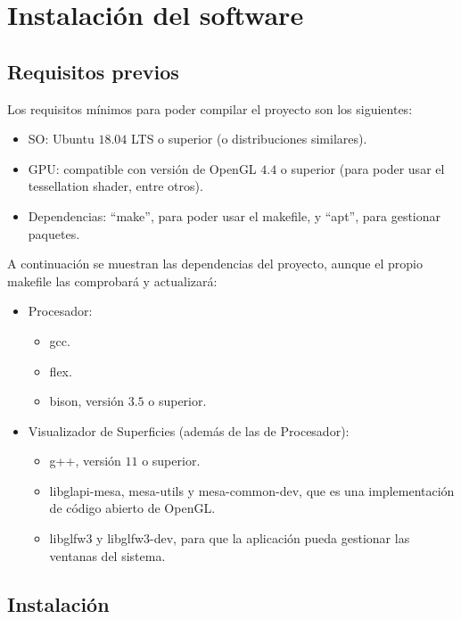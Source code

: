 
\chapter{Instalación del software}\label{ap:apendice1}

\section{Requisitos previos}

Los requisitos mínimos para poder compilar el proyecto son los siguientes:
\begin{itemize}
	\item SO: Ubuntu $18.04$ LTS o superior (o distribuciones similares).
	\item GPU: compatible con versión de OpenGL $4.4$ o superior (para poder usar el tessellation shader, entre otros).
	\item Dependencias: ``make'', para poder usar el makefile, y ``apt'', para gestionar paquetes.
\end{itemize}

A continuación se muestran las dependencias del proyecto, aunque el propio makefile las comprobará y actualizará:
\begin{itemize}
	\item Procesador:
	\begin{itemize}
		\item gcc.
		\item flex.
		\item bison, versión $3.5$ o superior.
	\end{itemize}
	\item Visualizador de Superficies (además de las de Procesador):
	\begin{itemize}
		\item g++, versión $11$ o superior.
		\item libglapi-mesa, mesa-utils y mesa-common-dev, que es una implementación de código abierto de OpenGL.
		\item libglfw$3$ y libglfw$3$-dev, para que la aplicación pueda gestionar las ventanas del sistema.
	\end{itemize}
\end{itemize}

\section{Instalación}

